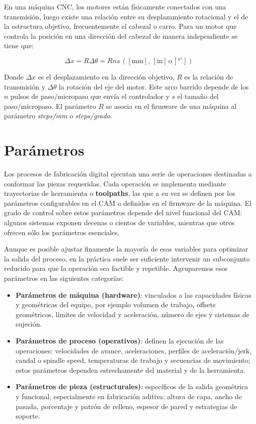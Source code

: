 En una máquina CNC, los motores están físicamente conectados con una transmisión, luego existe una relación entre su desplazamiento rotacional y el de la estructura objetivo, frecuentemente el cabezal o carro. Para un motor que controla la posición en una dirección del cabezal de manera independiente se tiene que:

\begin{equation}
    \Delta x = R\Delta \theta = R n s \,\mathrm{([mm], \,[in]\,o\,[{°}^\circ])} 
\end{equation}

Donde $\Delta x$ es el desplazamiento en la dirección objetivo, $R$ es la relación de transmisión y $\Delta \theta$ la rotación del eje del motor. Este arco barrido depende de los $n$ pulsos de paso/micropaso que envía el controlador y $s$ el tamaño del paso/micropaso. El parámetro $R$ se asocia en el firmware de una máquina al parámetro \textit{steps/mm} o \textit{steps/grado}.

\section{Parámetros}

Los procesos de fabricación digital ejecutan una serie de operaciones destinadas a conformar las piezas requeridas. Cada operación se implementa mediante trayectorias de herramienta o \textbf{toolpaths}, las que a su vez se definen por los parámetros configurables en el CAM o definidos en el firmware de la máquina. El grado de control sobre estos parámetros depende del nivel funcional del CAM: algunos sistemas exponen decenas o cientos de variables, mientras que otros ofrecen sólo los parámetros esenciales.

Aunque es posible ajustar finamente la mayoría de esas variables para optimizar la salida del proceso, en la práctica suele ser suficiente intervenir un subconjunto reducido para que la operación sea factible y repetible. Agruparemos esos parámetros en las siguientes categorías:

\begin{itemize} 
	
	\item \textbf{Parámetros de máquina (hardware)}: vinculados a las capacidades físicas y geométricas del equipo, por ejemplo volumen de trabajo, offsets geométricos, límites de velocidad y aceleración, número de ejes y sistemas de sujeción. 
	\item \textbf{Parámetros de proceso (operativos)}: definen la ejecución de las operaciones: velocidades de avance, aceleraciones, perfiles de aceleración/jerk, caudal o spindle speed, temperaturas de trabajo y secuencias de movimiento; estos parámetros dependen estrechamente del material y de la herramienta. 
	\item \textbf{Parámetros de pieza (estructurales)}: específicos de la salida geométrica y funcional, especialmente en fabricación aditiva: altura de capa, ancho de pasada, porcentaje y patrón de relleno, espesor de pared y estrategias de soporte. \end{itemize}

